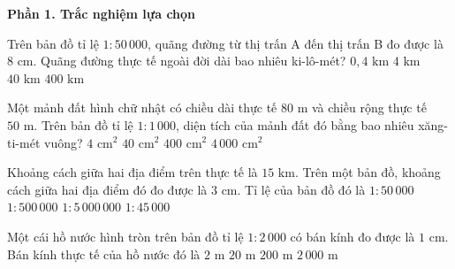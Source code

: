 \textbf{Phần 1. Trắc nghiệm lựa chọn}

\begin{ex} %
Trên bản đồ tỉ lệ $1 : 50\,000$, quãng đường từ thị trấn A đến thị trấn B đo được là $8\text{ cm}$. Quãng đường thực tế ngoài đời dài bao nhiêu ki-lô-mét?
\choice
{$0{,}4\text{ km}$}
{\True $4\text{ km}$}
{$40\text{ km}$}
{$400\text{ km}$}
\end{ex}

\begin{ex} %
Một mảnh đất hình chữ nhật có chiều dài thực tế $80\text{ m}$ và chiều rộng thực tế $50\text{ m}$. Trên bản đồ tỉ lệ $1 : 1\,000$, diện tích của mảnh đất đó bằng bao nhiêu xăng-ti-mét vuông?
\choice
{$4\text{ cm}^2$}
{\True $40\text{ cm}^2$}
{$400\text{ cm}^2$}
{$4\,000\text{ cm}^2$}
\end{ex}

\begin{ex} %
Khoảng cách giữa hai địa điểm trên thực tế là $15\text{ km}$. Trên một bản đồ, khoảng cách giữa hai địa điểm đó đo được là $3\text{ cm}$. Tỉ lệ của bản đồ đó là
\choice
{$1 : 50\,000$}
{\True $1 : 500\,000$}
{$1 : 5\,000\,000$}
{$1 : 45\,000$}
\end{ex}

\begin{ex} %
Một cái hồ nước hình tròn trên bản đồ tỉ lệ $1 : 2\,000$ có bán kính đo được là $1\text{ cm}$. Bán kính thực tế của hồ nước đó là
\choice
{$2\text{ m}$}
{\True $20\text{ m}$}
{$200\text{ m}$}
{$2\,000\text{ m}$}
\end{ex}

